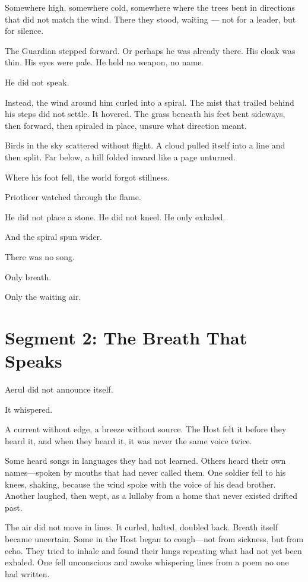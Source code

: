 \documentclass[9pt]{article}
\begin{document}
Somewhere high, somewhere cold, somewhere where the trees bent in directions that did not match the wind. There they stood, waiting — not for a leader, but for silence.

The Guardian stepped forward. Or perhaps he was already there. His cloak was thin. His eyes were pale. He held no weapon, no name.

He did not speak.

Instead, the wind around him curled into a spiral. The mist that trailed behind his steps did not settle. It hovered. The grass beneath his feet bent sideways, then forward, then spiraled in place, unsure what direction meant.

Birds in the sky scattered without flight. A cloud pulled itself into a line and then split. Far below, a hill folded inward like a page unturned.

Where his foot fell, the world forgot stillness.

Priotheer watched through the flame.

He did not place a stone. He did not kneel. He only exhaled.

And the spiral spun wider.

There was no song.

Only breath.

Only the waiting air.


\newpage

\section*{Segment 2: The Breath That Speaks}

Aerul did not announce itself.

It whispered.

A current without edge, a breeze without source. The Host felt it before they heard it, and when they heard it, it was never the same voice twice.

Some heard songs in languages they had not learned. Others heard their own names—spoken by mouths that had never called them. One soldier fell to his knees, shaking, because the wind spoke with the voice of his dead brother. Another laughed, then wept, as a lullaby from a home that never existed drifted past.

The air did not move in lines. It curled, halted, doubled back. Breath itself became uncertain. Some in the Host began to cough—not from sickness, but from echo. They tried to inhale and found their lungs repeating what had not yet been exhaled. One fell unconscious and awoke whispering lines from a poem no one had written.
\end{document}
